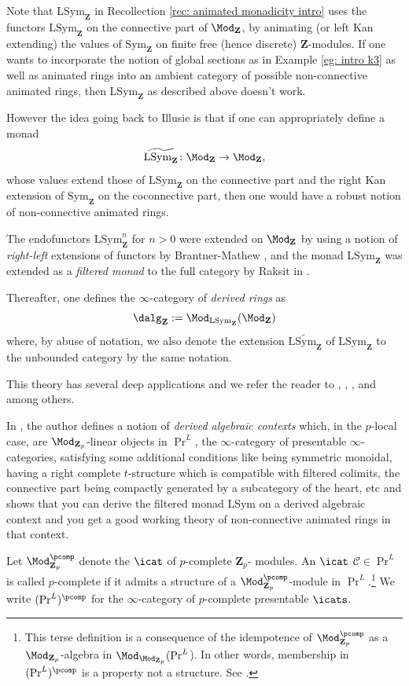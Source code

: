 \documentclass[10pt,reqno]{amsart}
\numberwithin{equation}{section}
\newcommand{\cC}{\mathcal{C}}
\newcommand{\ZZ}{\mathbf{Z}}
\newcommand{\Sym}{\mathrm{Sym}}
\renewcommand{\L}{\mathrm{L}}
\begin{document}
Note that $\L\Sym_{\ZZ}$ in Recollection \ref{rec: animated monadicity intro} uses the functors $\L\Sym_{\ZZ}$ on the connective part of $\Mod_\ZZ$, by animating (or left Kan extending) the values of $\Sym_\ZZ$ on finite free (hence discrete) $\ZZ$-modules. If one wants to incorporate the notion of global sections as in Example \ref{eg: intro k3} as well as animated rings into an ambient category of possible non-connective animated rings, then $\L\Sym_{\ZZ}$ as described above doesn't work.


However the idea going back to Illusie \cite[\S~I.4]{Illusie1971CotangentComplexI} is that if one can appropriately define a monad $$\widetilde{\L\Sym_{\ZZ}}\colon \Mod_\ZZ\to \Mod_\ZZ,$$ whose values extend those of $\L\Sym_\ZZ$ on the connective part and the right Kan extension of $\Sym_\ZZ$ on the coconnective part, then one would have a robust notion of non-connective animated rings.

The endofunctors $\L\Sym^n_\ZZ$ for $n>0$ were extended on $\Mod_\ZZ$ by using a notion of \emph{right-left} extensions of functors by Brantner-Mathew \cite[\S~3]{BrantnerMathewActa_toappear}, and the monad $\L\Sym_\ZZ$ was extended as a \emph{filtered monad} to the full category by Raksit in \cite[\S~4]{Rak20}. 

Thereafter, one defines the $\infty$-category of \emph{derived rings} as $$\dalg_{\ZZ}:=\Mod_{\L\Sym_{\ZZ}}(\Mod_\ZZ)$$ where, by abuse of notation, we also denote the extension $\widetilde{\L\Sym_{\ZZ}}$ of $\L\Sym_\ZZ$ to the unbounded category by the same notation.

This theory has several deep applications and we refer the reader to \cite{Antieau2025FiltrationsCohomologyI}, \cite{MM24}, \cite{MondalReinecke2026UnipotentHomotopySchemes}, \cite{petrov_de_rham} and \cite{Rak20} among others.


In \cite[Definition 4.2.1]{Rak20}, the author defines a notion of \emph{derived algebraic contexts} which, in the $p$-local case, are $\Mod_{\ZZ_p}$-linear objects in $\Pr^L$, the $\infty$-category of presentable $\infty$-categories, satisfying some additional conditions like being symmetric monoidal, having a right complete $t$-structure which is compatible with filtered colimits, the connective part being compactly generated by a subcategory of the heart, etc and shows that you can derive the filtered monad $\L\Sym$ on a derived algebraic context and you get a good working theory of non-connective animated rings in that context.

\begin{definition}\label{def: definition of pcomp in prl}
Let $\Mod_{\ZZ_p}^\pcomp$ denote the $\icat$ of $p$-complete $\ZZ_p$- modules. An $\icat$ $\cC\in \Pr^L$ is called $p$-complete if it admits a structure of a $\Mod_{\ZZ_p}^\pcomp$-module in $\Pr^L.$\footnote{This terse definition is a consequence of the idempotence of $\Mod_{\ZZ_p}^\pcomp$ as a $\Mod_{\ZZ_p}$-algebra in $\Mod_{\Mod_{\ZZ_p}}(\Pr^L$). In other words, membership in $(\Pr^L)^\pcomp$ is a property not a structure. See \cite[Appendix A]{AntieauKrauseNikolaus2023PrismaticDeltaRings}.} We write $(\Pr^L)^\pcomp$ for the $\infty$-category of $p$-complete presentable $\icats$.
\end{definition}
\end{document}
